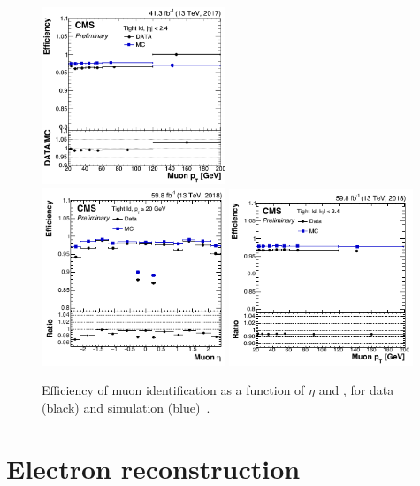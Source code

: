 \begin{figure}[!htpb]
  \includegraphics[width=0.49\textwidth]{plots/chapter5/Pt2017.png} \\
  \includegraphics[width=0.49\textwidth]{plots/chapter5/Eta2018.png}
  \includegraphics[width=0.49\textwidth]{plots/chapter5/Pt2018.png} \\
  \caption{Efficiency of muon identification as a function of $\eta$ and \pt, for data (black) and simulation (blue)~\cite{muon_pog}.}
  \label{fig:muoneff}
\end{figure}


\section{Electron reconstruction}

